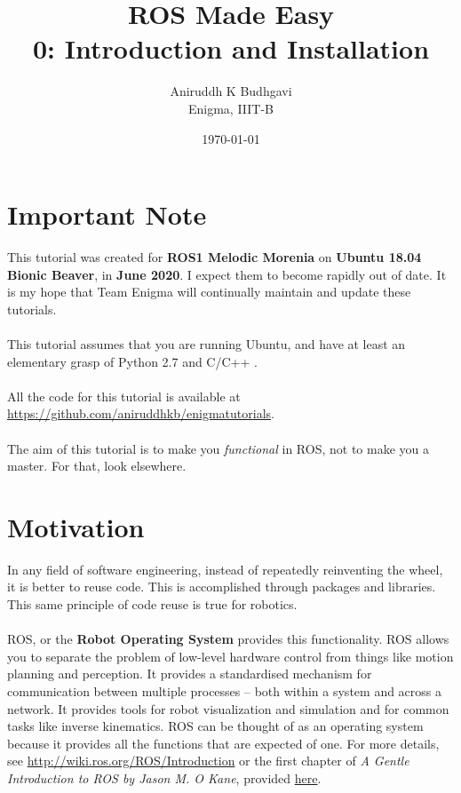 \documentclass{article}
\title{ROS Made Easy \\0: Introduction and Installation}
\date{\today}
\author{Aniruddh K Budhgavi \\Enigma, IIIT-B}
\begin{document}
    \maketitle
    \section{Important Note}
    This tutorial was created for \textbf{ROS1 Melodic Morenia}
    on \textbf{Ubuntu 18.04 Bionic Beaver}, in \textbf{June 2020}.
    I expect them to become rapidly out of date. It is my hope
    that Team Enigma will continually maintain and update these tutorials.
    \\
    \\
    This tutorial assumes that you are running Ubuntu, and have at least an
    elementary grasp of Python 2.7 and C/C++ .
    \\
    \\
    All the code for this tutorial is available at \url{https://github.com/aniruddhkb/enigmatutorials}.
    \\
    \\
    The aim of this tutorial is to make you \emph{functional} in ROS, not to make you a master. For 
    that, look elsewhere.
    \section{Motivation}
    In any field of software engineering, instead
    of repeatedly reinventing the wheel, it is better to
    reuse code. This is accomplished through packages and libraries.
    This same principle of code reuse is true for robotics.
    \\
    \\
    ROS, or the \textbf{Robot Operating System} provides this
    functionality. ROS allows you to separate the problem of
    low-level hardware control from things like motion planning and
    perception. It provides a standardised mechanism for communication
    between multiple processes -- both within a system and across a network.
    It provides tools for robot visualization and simulation
    and for common tasks like inverse kinematics. ROS can be thought
    of as an operating system because it provides all the functions
    that are expected of one. For more details, see \url{http://wiki.ros.org/ROS/Introduction}
    or the first chapter of \emph{A Gentle Introduction to ROS by Jason M. O Kane}, provided 
    \href{https://github.com/aniruddhkb/enigmatutorials/blob/master/intro2ros/tutorial_docs/agitr-small.pdf}{here}.
\end{document}
